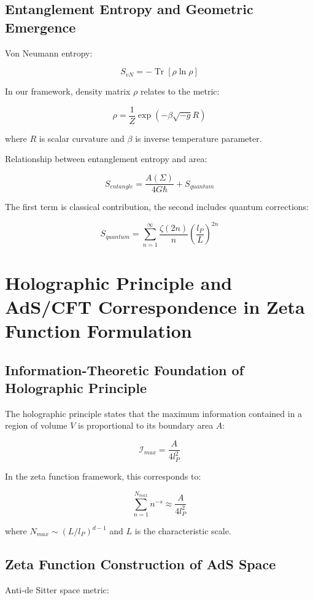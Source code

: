 \documentclass[12pt,a4paper]{article}
\DeclareMathOperator{\Tr}{Tr}
\begin{document}
\subsection{Entanglement Entropy and Geometric Emergence}

Von Neumann entropy:

$$S_{vN} = -\Tr[\rho \ln \rho]$$

In our framework, density matrix $\rho$ relates to the metric:

$$\rho = \frac{1}{Z} \exp\left(-\beta \sqrt{-g} R\right)$$

where $R$ is scalar curvature and $\beta$ is inverse temperature parameter.

Relationship between entanglement entropy and area:

$$S_{entangle} = \frac{A(\Sigma)}{4G\hbar} + S_{quantum}$$

The first term is classical contribution, the second includes quantum corrections:

$$S_{quantum} = \sum_{n=1}^{\infty} \frac{\zeta(2n)}{n} \left(\frac{l_P}{L}\right)^{2n}$$

\section{Holographic Principle and AdS/CFT Correspondence in Zeta Function Formulation}

\subsection{Information-Theoretic Foundation of Holographic Principle}

The holographic principle states that the maximum information contained in a region of volume $V$ is proportional to its boundary area $A$:

$$\mathcal{I}_{max} = \frac{A}{4l_P^2}$$

In the zeta function framework, this corresponds to:

$$\sum_{n=1}^{N_{max}} n^{-s} \approx \frac{A}{4l_P^2}$$

where $N_{max} \sim (L/l_P)^{d-1}$ and $L$ is the characteristic scale.

\subsection{Zeta Function Construction of AdS Space}

Anti-de Sitter space metric:
\end{document}
